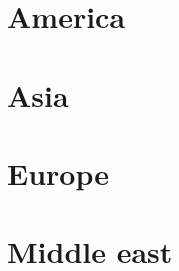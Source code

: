 \documentclass[10pt, a5paper]{book}
\begin{document}
\begin{multicols}{2}
\chapter{America}


\chapter{Asia}


\chapter{Europe}


\chapter{Middle east}




\vfill\null
\columnbreak
\end{multicols}

\pagebreak
{}
\vfill

\pagebreak
\printindex
\vfill

\pagebreak

\end{document}
